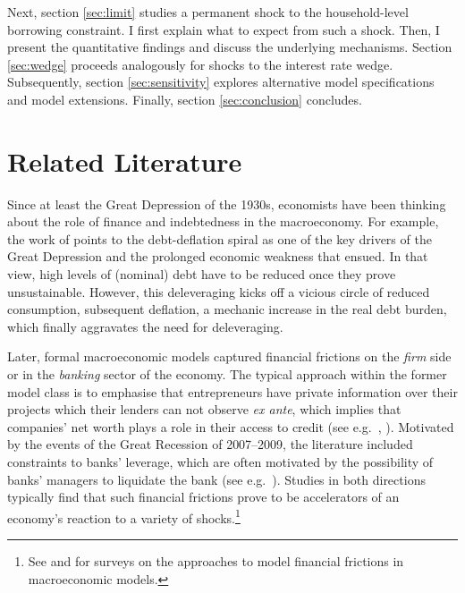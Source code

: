 \documentclass[12pt]{article} %
\numberwithin{equation}{section} %
\numberwithin{figure}{section}
\numberwithin{table}{section}
\begin{document}
Next, section \ref{sec:limit} studies a permanent shock to the household-level borrowing constraint. I first explain what to expect from such a shock. Then, I present the quantitative findings and discuss the underlying mechanisms. Section \ref{sec:wedge} proceeds analogously for shocks to the interest rate wedge. Subsequently, section \ref{sec:sensitivity} explores alternative model specifications and model extensions. Finally, section \ref{sec:conclusion} concludes.

\section{Related Literature}
\label{sec:literature}

Since at least the Great Depression of the 1930s, economists have been thinking about the role of finance and indebtedness in the macroeconomy. For example, the work of \textcite{fisher1933} points to the debt-deflation spiral as one of the key drivers of the Great Depression and the prolonged economic weakness that ensued. In that view, high levels of (nominal) debt have to be reduced once they prove unsustainable. However, this deleveraging kicks off a vicious circle of reduced consumption, subsequent deflation, a mechanic increase in the real debt burden, which finally aggravates the need for deleveraging.

Later, formal macroeconomic models captured financial frictions on the \textit{firm} side or in the \textit{banking} sector of the economy. The typical approach within the former model class is to emphasise that entrepreneurs have private information over their projects which their lenders can not observe \textit{ex ante}, which implies that companies' net worth plays a role in their access to credit (see e.g.~\cite{bg1989}, \cite{bgg1999}). Motivated by the events of the Great Recession of 2007--2009, the literature included constraints to banks' leverage, which are often motivated by the possibility of banks' managers to liquidate the bank (see e.g.~\cite{gertler2011}). Studies in both directions typically find that such financial frictions prove to be accelerators of an economy's reaction to a variety of shocks.\footnote{See \textcite{brunnermeier2012} and \textcite{christiano2022} for surveys on the approaches to model financial frictions in macroeconomic models.}
\end{document}
